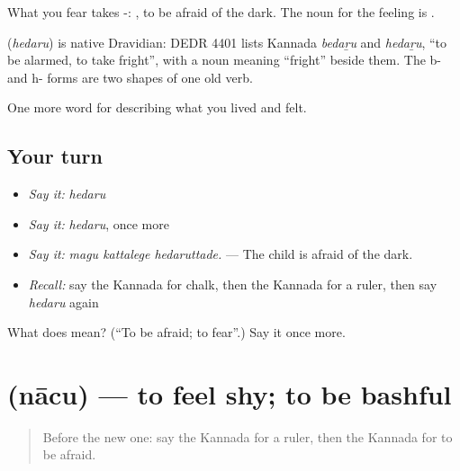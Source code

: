 What you fear takes -:  , to be afraid of the dark. The noun for the feeling is .

\begin{cousinweb}
\textbf{} (\emph{hedaru}) is native Dravidian: DEDR 4401 lists Kannada \emph{bedaṟu} and \emph{hedaṟu}, \textquotedblleft{}to be alarmed, to take fright\textquotedblright{}, with a noun meaning \textquotedblleft{}fright\textquotedblright{} beside them. The b- and h- forms are two shapes of one old verb.
\end{cousinweb}

\begin{grammarlens}[title={What you've built}]
One more word for describing what you lived and felt.
\end{grammarlens}

\subsection*{Your turn}
\begin{itemize}
\raggedright
  \item \emph{Say it:} \emph{hedaru}
  \item \emph{Say it:} \emph{hedaru}, once more
  \item \emph{Say it:} \emph{magu kattalege hedaruttade.} — The child is afraid of the dark.
  \item \emph{Recall:} say the Kannada for chalk, then the Kannada for a ruler, then say \emph{hedaru} again
\end{itemize}

\begin{tcolorbox}[breakable,colback=teal!4,colframe=teal!35!black,title={Before you move on}]
What does  mean? (\textquotedblleft{}To be afraid; to fear\textquotedblright{}.) Say it once more.
\end{tcolorbox}
\section[\texorpdfstring{\kn{ನಾಚು} (nācu)}{ನಾಚು (nācu)}]{ (nācu) — to feel shy; to be bashful}

\label{lesson:KA-C490-nacu}



\begin{quote}
Before the new one: say the Kannada for a ruler, then the Kannada for to be afraid.
\end{quote}

